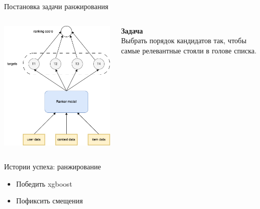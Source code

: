 \documentclass[11pt,aspectratio=169,handout]{beamer}
\begin{document}
\begin{frame}{Постановка задачи ранжирования}

\begin{columns}

\begin{column}{0.45\textwidth} 
\begin{center}
\includegraphics[scale=0.3]{images/ranker-framework.png}
\end{center}
\end{column}

\begin{column}{0.45\textwidth}
{\bf Задача} \\
Выбрать порядок кандидатов так, чтобы самые релевантные стояли в голове списка.
\end{column}

\end{columns}

\end{frame}

\begin{frame}{Истории успеха: ранжирование}

\begin{tcolorbox}[colback=info!5,colframe=info!80,title=Как оставить след в науке]
\begin{itemize}
\item Победить xgboost
\item Пофиксить смещения
\end{itemize}
\end{tcolorbox}

\end{frame}
\end{document}

